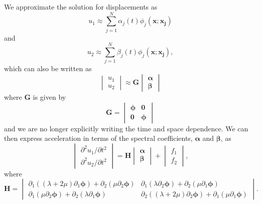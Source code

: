 \documentclass[12pt]{article}
\begin{document}
We approximate the solution for displacements as 
\begin{equation}
  u_1 \approx \sum_{j=1}^{N}\alpha_{j}(t)\phi_j(\boldsymbol{x};\boldsymbol{x_j})
\end{equation}
and
\begin{equation}
  u_2 \approx \sum_{j=1}^{N}\beta_{j}(t)\phi_j(\boldsymbol{x};\boldsymbol{x_j}),
\end{equation}
which can also be written as 
\begin{equation}
\begin{vmatrix}
  u_1 \\
  u_2 
\end{vmatrix} \approx 
\boldsymbol{G}
\begin{vmatrix}
  \boldsymbol{\alpha}\\
  \boldsymbol{\beta}
\end{vmatrix}
\end{equation}
where $\boldsymbol{G}$ is given by
\begin{equation}
\boldsymbol{G} = 
\begin{vmatrix}
\boldsymbol{\phi}&\boldsymbol{0}\\
\boldsymbol{0}&\boldsymbol{\phi}
\end{vmatrix}
\end{equation}
and we are no longer explicitly writing the time and space dependence.
We can then express acceleration in terms of the spectral
coefficients, $\boldsymbol{\alpha}$ and $\boldsymbol{\beta}$, as
\begin{equation}\label{Acceleration}
\begin{vmatrix}
  \partial^2 u_1/\partial t^2\\
  \partial^2 u_2/\partial t^2
\end{vmatrix} =
\boldsymbol{H}
\begin{vmatrix}
  \boldsymbol{\alpha}\\
  \boldsymbol{\beta}
\end{vmatrix} + 
\begin{vmatrix}
  f_1\\
  f_2
\end{vmatrix},
\end{equation}
where
\begin{equation}
\boldsymbol{H} = 
\begin{vmatrix}
 \partial_1\left((\lambda + 2\mu)\partial_1 \boldsymbol{\phi}\right) +  
 \partial_2\left(\mu\partial_2 \boldsymbol{\phi}\right)&
 \partial_1\left(\lambda\partial_2 \boldsymbol{\phi}\right) +  
 \partial_2\left(\mu\partial_1 \boldsymbol{\phi}\right)\\
 \partial_1\left(\mu\partial_2 \boldsymbol{\phi}\right) +  
 \partial_2\left(\lambda\partial_1 \boldsymbol{\phi}\right)&
 \partial_2\left((\lambda + 2\mu)\partial_2 \boldsymbol{\phi}\right) +  
 \partial_1\left(\mu\partial_1 \boldsymbol{\phi}\right) 
\end{vmatrix}.
\end{equation}
\end{document}
